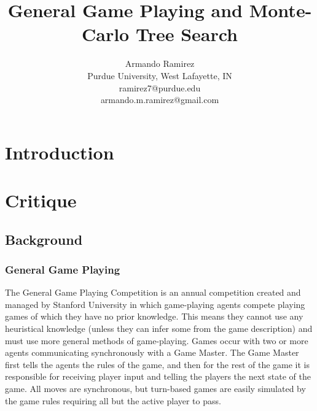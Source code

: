 \documentclass[letterpaper]{article}
\title{General Game Playing and Monte-Carlo Tree Search}
\author{Armando Ramirez \\ Purdue University, West Lafayette, IN \\ ramirez7@purdue.edu \\ armando.m.ramirez@gmail.com}
\begin{document}
\maketitle

\section{Introduction}

\section{Critique}

\subsection{Background}

\subsubsection{General Game Playing}
The General Game Playing Competition is an annual competition created and managed by Stanford University in which game-playing agents compete playing games of which they have no prior knowledge.\cite{StanfordGGP} This means they cannot use any heuristical knowledge (unless they can infer some from the game description) and must use more general methods of game-playing. Games occur with two or more agents communicating synchronously with a Game Master. The Game Master first tells the agents the rules of the game, and then for the rest of the game it is responsible for receiving player input and telling the players the next state of the game. All moves are synchronous, but turn-based games are easily simulated by the game rules requiring all but the active player to pass.
\end{document}
